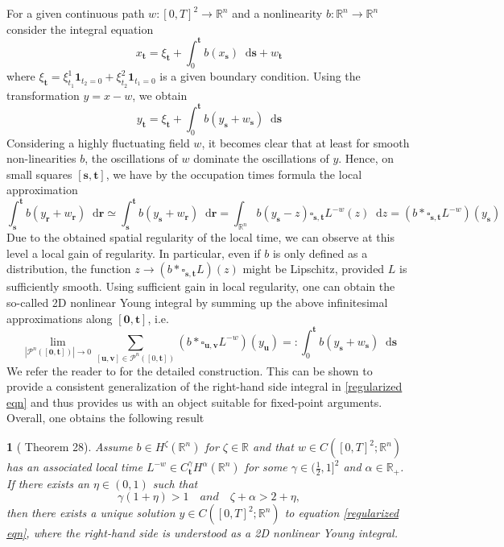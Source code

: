 \documentclass[11pt,oneside,english,reqno]{amsart}
\numberwithin{equation}{section}
\numberwithin{figure}{section}
\theoremstyle{plain}
\newtheorem{thm}{\protect\theoremname}
\theoremstyle{definition}
\theoremstyle{remark}
\theoremstyle{plain}
\theoremstyle{plain}
\theoremstyle{plain}
\theoremstyle{plain}
\theoremstyle{plain}
\providecommand{\theoremname}{Theorem}
\newcommand{\RR}{\mathbb{R}}
\newcommand{\br}{\mathbf{r}}
\newcommand{\boo}{\mathbf{0}}
\newcommand{\bu}{\mathbf{u}}
\newcommand{\bv}{\mathbf{v}}
\newcommand{\bs}{\mathbf{s}}
\newcommand{\bt}{\mathbf{t}}
\newcommand{\dd}{\mathop{}\!\mathrm{d}}
\begin{document}
\bigskip

For a given continuous path $w:[0,T]^2\to \RR^n$ and a nonlinearity $b:\RR^n\to \RR^n$ consider the integral equation
\[
x_\bt=\xi_\bt+\int_0^{\bt} b(x_\bs)\dd \bs+w_\bt
\]
where $\xi_\bt=\xi^1_{t_1}\mathbf{1}_{t_2=0}+\xi^2_{t_2}\mathbf{1}_{t_1=0}$ is a given boundary condition. Using the transformation $y=x-w$, we obtain 
\begin{equation}
    y_\bt=\xi_\bt+\int_0^{\bt} b(y_\bs+w_\bs)\dd\bs
    \label{regularized eqn}
\end{equation}
%
Considering a highly fluctuating field $w$, it becomes clear that at least for smooth non-linearities $b$, the oscillations of $w$ dominate the oscillations of $y$. Hence, on small squares $[\bs, \bt]$, we have by the occupation times formula the local approximation 
\[
\int_\bs^\bt b(y_\br+w_\br)\dd\br \simeq \int_\bs^\bt b(y_\bs+w_\br)\dd\br=\int_{\RR^n} b(y_\bs-z)\square_{\bs, \bt}L^{-w}(z)\dd z=(b*\square_{\bs, \bt}L^{-w})(y_\bs)
\]
Due to the obtained spatial regularity of the local time, we can observe at this level a local gain of regularity. In particular, even if $b$ is only defined as a distribution, the function $z\to (b*\square_{\bs, \bt}L)(z)$ might be Lipschitz, provided $L$ is sufficiently smooth. Using sufficient gain in local regularity, one can obtain the so-called 2D nonlinear Young integral by summing up the above infinitesimal approximations along $[\boo, \bt]$, i.e.
\[
\lim_{|\mathcal{P}^n([\boo, \bt])|\to 0}\sum_{[\bu, \bv]\in \mathcal{P}^n([0, \bt])}(b*\square_{\bu, \bv}L^{-w})(y_\bu)=:\int_0^\bt b(y_\bs+w_\bs)\dd\bs
\]
We refer the reader to \cite[Section 3]{Bechtold2023} for the detailed construction. This can be shown to provide a consistent generalization of the right-hand side integral in \eqref{regularized eqn} and thus provides us with an object suitable for fixed-point arguments. Overall, one obtains the following result
\begin{thm}[\cite{Bechtold2023} Theorem 28]
  Assume $b\in H^\zeta(\RR^n)$ for $\zeta \in \RR$ and that $w\in C([0,T]^2;\RR^n)$ has an associated local time $L^{-w}\in C^\gamma_\bt H^\alpha(\RR^n)$ for some $\gamma\in (\frac{1}{2},1]^2$ and $\alpha \in \RR_+$. If  there exists an   $\eta\in (0,1)$  such that 
\begin{equation}
   \gamma(1+\eta)>1\quad  and \quad \zeta+\alpha>2+\eta, 
   \label{regularity condition}
\end{equation}
then there exists a unique solution $y\in C([0,T]^2;\RR^n)$ to equation \ref{regularized eqn}, where the right-hand side is understood as a 2D nonlinear Young integral. 
\end{thm}
\end{document}
